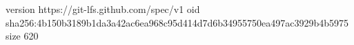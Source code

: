 version https://git-lfs.github.com/spec/v1
oid sha256:4b150b3189b1da3a42ac6ea968c95d414d7d6b34955750ea497ac3929b4b5975
size 620
